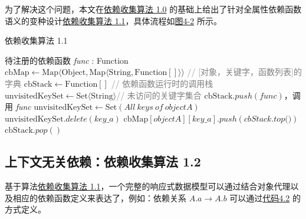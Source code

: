 \documentclass[winfonts,master,twoside]{njuthesis}
\begin{document}
为了解决这个问题，本文在\hyperref[dependency-collect-algorithm-1.0]{依赖收集算法 1.0} 的基础上给出了针对全属性依赖函数语义的变种设计\hyperref[dependency-collect-algorithm-1.1]{依赖收集算法 1.1}，具体流程如\hyperref[algorithm-1.1]{图4-2} 所示。

\begin{algorithm}[H]
    \caption{依赖收集算法 1.1}
    \label{dependency-collect-algorithm-1.1}
    \begin{algorithmic}[1]
        \REQUIRE 待注册的依赖函数 \textit{func} : Function
        \STATE $\text{cbMap} \gets \text{Map}\langle \text{Object}, \text{Map}\langle \text{String}, \text{Function}[]\rangle\rangle$ \footnotesize\textcolor{gray}{// [对象，关键字，函数列表]的字典}\normalsize
        \STATE $\text{cbStack} \gets \text{Function}[]$ \footnotesize\textcolor{gray}{// 依赖函数运行时的调用栈}\normalsize
        \STATE $\text{unvisitedKeySet} \gets \text{Set}\langle\text{String}\rangle$\footnotesize\textcolor{gray}{// 未访问的关键字集合}\normalsize
        \STATE $\text{cbStack}.push(\textit{func})$，调用 \textit{func}
        \STATE $\text{unvisitedKeySet} \gets \text{Set}(All\ keys\ of\ objectA)$
        \ENDIF
        \STATE $\text{unvisitedKeySet}.delete(key\_a)$
        \ENDIF
        \STATE $\text{cbMap}[objectA][key\_a].push(\textit{cbStack.top()})$
        \ENDIF
        \ENDIF
        \ENDWHILE
        \STATE $\text{cbStack}.pop()$
    \end{algorithmic}
\end{algorithm}

\subsection{上下文无关依赖：依赖收集算法 1.2}\label{reactive-data-model-context-free-dependency}

基于算法\hyperref[dependency-collect-algorithm-1.1]{依赖收集算法 1.1}，一个完整的响应式数据模型可以通过结合对象代理以及相应的依赖函数定义来表达了，例如：依赖关系 $A.a \rightarrow A.b$ 可以通过\hyperref[create-reactive-data-model]{代码4.2} 的方式定义。
\end{document}
